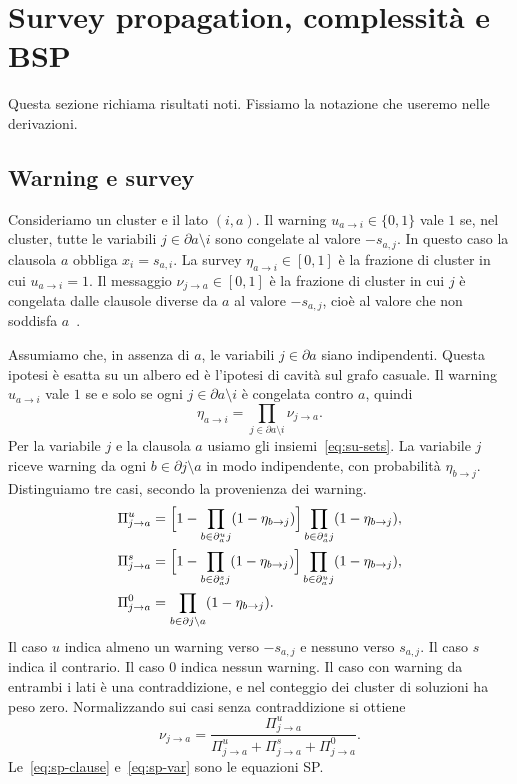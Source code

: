 \section{Survey propagation, complessità e BSP}
\label{sec:spbsp}

Questa sezione richiama risultati noti.
Fissiamo la notazione che useremo nelle derivazioni.

\subsection{Warning e survey}

Consideriamo un cluster e il lato $(i,a)$.
Il warning $u_{a\to i}\in\{0,1\}$ vale $1$ se, nel cluster, tutte le variabili $j\in\partial a\setminus i$ sono congelate al valore $-s_{a,j}$.
In questo caso la clausola $a$ obbliga $x_i=s_{a,i}$.
La survey $\eta_{a\to i}\in[0,1]$ è la frazione di cluster in cui $u_{a\to i}=1$.
Il messaggio $\nu_{j\to a}\in[0,1]$ è la frazione di cluster in cui $j$ è congelata dalle clausole diverse da $a$ al valore $-s_{a,j}$, cioè al valore che non soddisfa $a$~\citep{mezard2002analytic,braunstein2005survey}.

Assumiamo che, in assenza di $a$, le variabili $j\in\partial a$ siano indipendenti.
Questa ipotesi è esatta su un albero ed è l'ipotesi di cavità sul grafo casuale.
Il warning $u_{a\to i}$ vale $1$ se e solo se ogni $j\in\partial a\setminus i$ è congelata contro $a$, quindi
\begin{equation}
\eta_{a\to i}=\prod_{j\in\partial a\setminus i}\nu_{j\to a}.
\label{eq:sp-clause}
\end{equation}
Per la variabile $j$ e la clausola $a$ usiamo gli insiemi~\eqref{eq:su-sets}.
La variabile $j$ riceve warning da ogni $b\in\partial j\setminus a$ in modo indipendente, con probabilità $\eta_{b\to j}$.
Distinguiamo tre casi, secondo la provenienza dei warning.
\begin{align}
\Pi^u_{j\to a}&=\Bigl[1-\prod_{b\in\partial^u_a j}(1-\eta_{b\to j})\Bigr]\prod_{b\in\partial^s_a j}(1-\eta_{b\to j}),\label{eq:Pi-u}\\
\Pi^s_{j\to a}&=\Bigl[1-\prod_{b\in\partial^s_a j}(1-\eta_{b\to j})\Bigr]\prod_{b\in\partial^u_a j}(1-\eta_{b\to j}),\label{eq:Pi-s}\\
\Pi^0_{j\to a}&=\prod_{b\in\partial j\setminus a}(1-\eta_{b\to j}).\label{eq:Pi-0}
\end{align}
Il caso $u$ indica almeno un warning verso $-s_{a,j}$ e nessuno verso $s_{a,j}$.
Il caso $s$ indica il contrario.
Il caso $0$ indica nessun warning.
Il caso con warning da entrambi i lati è una contraddizione, e nel conteggio dei cluster di soluzioni ha peso zero.
Normalizzando sui casi senza contraddizione si ottiene
\begin{equation}
\nu_{j\to a}=\frac{\Pi^u_{j\to a}}{\Pi^u_{j\to a}+\Pi^s_{j\to a}+\Pi^0_{j\to a}}.
\label{eq:sp-var}
\end{equation}
Le~\eqref{eq:sp-clause} e~\eqref{eq:sp-var} sono le equazioni SP.

